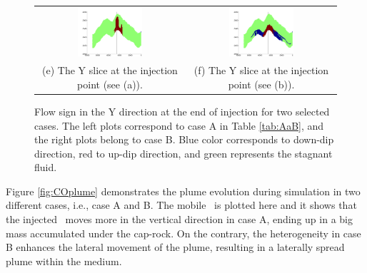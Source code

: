 \begin{figure}
\begin{tabular}{cc}
\includegraphics[width=0.45\textwidth]{./figurer/C02222_FlowSign_slcy}&
\includegraphics[width=0.45\textwidth]{./figurer/C03211_FlowSign_slcy}
\\(e) The Y slice at the injection point (see (a)).&
(f) The Y slice at the injection point (see (b)).
\end{tabular}
\caption{Flow sign in the Y direction at the end of injection for two selected cases. The left plots correspond to case A in Table \ref{tab:AaB}, and the right plots belong to case B. Blue color corresponds to down-dip direction, red to up-dip direction, and green represents the stagnant fluid.}
\label{fig:FOSEOI}
\end{figure}

Figure \ref{fig:COplume} demonstrates the plume evolution during simulation in two different cases, i.e., case A and B. The mobile \coo\ is plotted here and it shows that the injected \coo\ moves more in the vertical direction in case A, ending up in a big mass accumulated under the cap-rock. On the contrary, the heterogeneity in case B enhances the lateral movement of the plume, resulting in a laterally spread plume within the medium.

